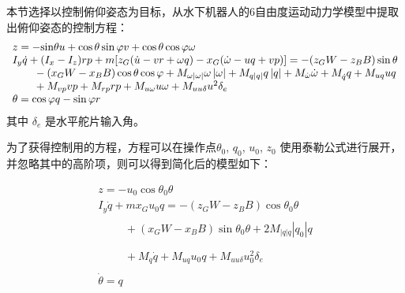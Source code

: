本节选择以控制俯仰姿态为目标，从水下机器人的6自由度运动动力学模型中提取出俯仰姿态的控制方程：
\begin{equation}
\label{depth_equ}
\begin{array}{l}
 z =  - {\rm{sin}}\theta u + \cos \theta \sin \varphi v + \cos \theta \cos \varphi \omega  \\
 {I_y}\dot q + ({I_x} - {I_z})rp + m[{z_G}(\dot u - vr + \omega q) - {x_G}(\dot \omega  - uq + vp)] =  - ({z_G}W - {z_B}B)\sin \theta  \\
 \begin{array}{*{20}{c}}
   {} & {}  \\
\end{array} - ({x_G}W - {x_B}B)\cos \theta \cos \varphi  + {M_{\omega \left| \omega  \right|}}\omega \left| \omega  \right| + {M_{q\left| q \right|}}q\left| q \right| + {M_{\dot \omega }}\dot \omega  + M_{\dot q}^{}q + {M_{uq}}uq \\
 \begin{array}{*{20}{c}}
   {} & {}  \\
\end{array} + {M_{vp}}vp + {M_{rp}}rp + {M_{u\omega }}u\omega  + {M_{uu\delta }}{u^2}{\delta _e} \\
 \theta  = \cos \varphi q - \sin \varphi r \\
 \end{array}
\end{equation}
其中 $\delta_e$ 是水平舵片输入角。

为了获得控制用的方程，方程可以在操作点$\theta_0$, $q_0$, $u_0$, $z_0$ 使用泰勒公式进行展开，并忽略其中的高阶项，则可以得到简化后的模型如下：

\begin{equation}
\begin{array}{l}
 z =  - {u_0}\cos {\theta _0}\theta  \\
 {I_y}\dot q + m{x_G}{u_0}q =  - ({z_G}W - {z_B}B)\cos {\theta _0}\theta  \\
 \begin{array}{*{20}{c}}
   {\begin{array}{*{20}{c}}
   {} & {}  \\
\end{array}}  \\
\end{array} + ({x_G}W - {x_B}B)\sin {\theta _0}\theta  + 2{M_{\left| q \right|q}}\left| {{q_0}} \right|q \\
 \begin{array}{*{20}{c}}
   {\begin{array}{*{20}{c}}
   {} & {}  \\
\end{array}}  \\
\end{array} + {M_{\dot q}}\dot q + {M_{uq}}{u_0}q + {M_{uu\delta }}u_0^2{\delta _e} \\
 \dot \theta  = q \\
 \end{array}
\end{equation}

